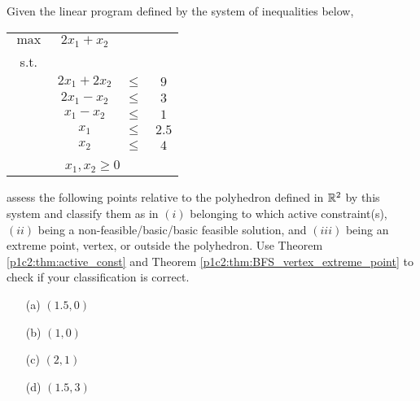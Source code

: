 Given the linear program defined by the system of inequalities below,

\begin{center}
	\begin{enumerate}
		\begin{tabular}{*4c}
			$\max$ & $2x_1 + x_2$ & \\
			s.t. \\
			& $2x_1 + 2x_2$ & $\leq$ & $9$  \\
			& $2x_1 -  x_2$ & $\leq$ & $3$  \\
			& $ x_1 -  x_2$ & $\leq$ & $1$  \\
			& $x_1$         & $\leq$ & $2.5$\\
			& $x_2$         & $\leq$ & $4$  \\
			\\
			\multicolumn{4}{c}{$x_1, x_2 \geq 0$}\\
		\end{tabular}
	\end{enumerate}
\end{center}

\noindent assess the following points relative to the polyhedron defined in $\mathbb{R}^2$ by this system and classify them as in $(i)$ belonging to which active constraint(s), $(ii)$ being a non-feasible/basic/basic feasible solution, and $(iii)$ being an extreme point, vertex, or outside the polyhedron. Use Theorem \ref{p1c2:thm:active_const} and Theorem \ref{p1c2:thm:BFS_vertex_extreme_point} to check if your classification is correct.

\begin{itemize}
	\item[(a)] $(1.5,0)$
	\item[(b)] $(1,0)$
	\item[(c)] $(2,1)$
	\item[(d)] $(1.5,3)$
\end{itemize}